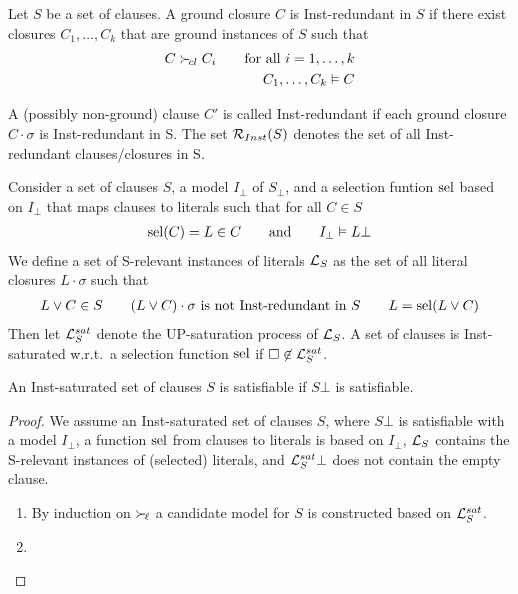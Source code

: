\begin{definition}
    Let $S$ be a set of clauses.
    A ground closure $C$ is {\myem Inst-redundant} in $S$
    if there exist closures $C_1,\ldots,C_k$
    that are ground instances of $S$ such that
    \begin{align*}
        C \mathrel\succ_{\!cl} C_i \tag*{for all $i=1,\ldots,k$} \\
        C_1,\ldots,C_k\vDash C
    \end{align*}

    A (possibly non-ground) clause $C'$ is called Inst-redundant
    if each ground closure $C\cdot\sigma$ is Inst-redundant in S.
    The set $\mathcal{R}_{Inst}(S)$ denotes the set of all Inst-redundant clauses/closures in S.
\end{definition}

\begin{definition}
    Consider a set of clauses $S$, a model $I_\bot$ of $S_\bot$,
    and a {\myem selection funtion} $\operatorname{sel}$ based on $I_\bot$
    that maps clauses to literals such that for all $C\in S$
    \begin{gather*}
        \operatorname{sel}(C)=L \in C
        \qquad
        \text{and}
        \qquad
        I_\bot \vDash L\bot
    \end{gather*}
    We define a set of {\myem S-relevant} instances of literals $\mathcal{L}_S$
    as the set of all literal closures $L\cdot\sigma$ such that
    \begin{gather*}
        L\lor C\in S
        \qquad
        (L\lor C)\cdot\sigma\text{ is not Inst-redundant in }S
        \qquad
        L = \operatorname{sel}(L\lor C)
    \end{gather*}
    Then let $\mathcal{L}_S^{sat}$ denote the UP-saturation process of $\mathcal{L}_S$.
    A set of clauses is {\myem Inst-saturated} w.r.t.~a selection function $\operatorname{sel}$
    if $\square\not\in\mathcal{L}_S^{sat}$.
\end{definition}

\begin{theorem}
    An Inst-saturated set of clauses $S$ is satisfiable if $S\bot$ is satisfiable.
\end{theorem}

\begin{proof}
    We assume an Inst-saturated set of clauses $S$,
    where $S\bot$ is satisfiable with a model $I_\bot$,
    a function $\operatorname{sel}$ from clauses to literals is based on $I_\bot$,
    $\mathcal{L}_S$ contains the S-relevant instances of (selected) literals,
    and $\mathcal{L}_S^{sat}\bot$ does not contain the empty clause.

    \begin{enumerate}
        \item By induction on $\mathrel\succ_{\!\ell}$
        a candidate model for $S$ is constructed
        based on $\mathcal{L}_S^{sat}$.

        \item
    \end{enumerate}
\end{proof}

